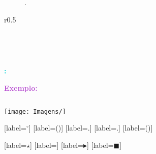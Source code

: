 \begin{figure}[h]
    \centering
    \caption{.}
    \label{fig:}
\end{figure}

\begin{wrapfigure}{r}{0.5\textwidth}
    \centering
    \caption{}
    \label{fig:}
\end{wrapfigure}

\begin{figure}[h]
    \centering
     \\ %
    \caption{}
    \label{fig:}
\end{figure}
  
 \\ %


\textcolor{MediumOrchid}{\textbf{}}

\ce{^{}}

\textcolor{DarkTurquoise}{\textbf{:}}

\textcolor{MediumOrchid}{\textbf{Exemplo:}}


\textcolor{CarnationPink}{$$}

\begin{center}
\texttt{[image: Imagens/]}
\end{center}

[label=\textcolor{CarnationPink}{\arabic*${}^\circ$}]
[label=\textcolor{CarnationPink}{(\alph*)}]
[label=\textcolor{CarnationPink}{\roman*.}]
[label=\textcolor{CarnationPink}{\arabic*.}]
[label=\textcolor{CarnationPink}{(\roman*)}]


[label=\textcolor{CarnationPink}{$\star$}]
[label=\textcolor{CarnationPink}{\textopenbullet}]
[label=\textcolor{CarnationPink}{$\blacktriangleright$}]
[label=\textcolor{CarnationPink}{$\blacksquare$}]


\textcolor{CarnationPink}{$\mathbf{}$}

\textcolor{DarkTurquoise}{\textbf{}}
\textcolor{MediumOrchid}{\textbf{}}


\begin{tcolorbox}[width=\textwidth, colback={white}, colbacktitle={DarkTurquoise!50!white}, title={$\bigstar$ \LobsterTwo{Observação} $\bigstar $}, coltitle={CarnationPink}, colframe={DarkTurquoise}, fonttitle=\rmfamily\bfseries\Large]

\end{tcolorbox}

